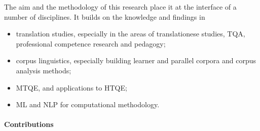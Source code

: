 The aim and the methodology of this research place it at the interface of a number of disciplines. It builds on the knowledge and findings in 
\begin{itemize}\compresslist{}
	\item translation studies, especially in the areas of translationese studies, \gls{TQA}, professional competence research and pedagogy;
	\item corpus linguistics, especially building learner and parallel corpora and corpus analysis methods; 
	\item \gls{MTQE}, and applications to HTQE;
	\item \gls{ML} and \gls{NLP} for computational methodology.
\end{itemize}

\paragraph{Contributions}

